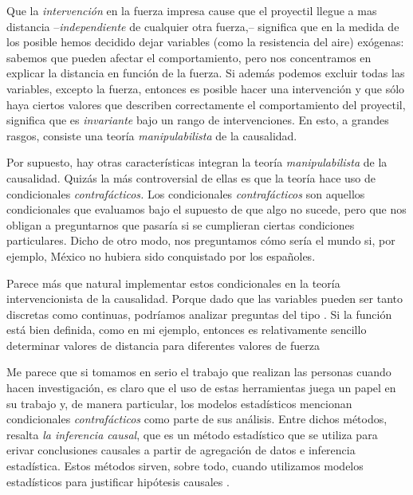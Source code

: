 Que la \emph{intervención} en la fuerza impresa cause que el
proyectil llegue a mas distancia --\emph{independiente} de cualquier
otra fuerza,-- significa que en la medida de los posible hemos
decidido dejar variables (como la resistencia del aire) exógenas:
sabemos que pueden afectar el comportamiento, pero nos concentramos
en explicar la distancia en función de la fuerza. Si además podemos
excluir todas las variables, excepto la fuerza, entonces es posible
hacer una intervención  y que sólo haya ciertos
valores que describen correctamente el comportamiento del proyectil,
significa que es \emph{invariante} bajo un rango de intervenciones.
En esto, a grandes rasgos, consiste una teoría \emph{manipulabilista}
de la causalidad.

Por supuesto, hay otras características integran la teoría \emph
{manipulabilista} de la causalidad. Quizás la más controversial de
ellas es que la teoría hace uso de condicionales
\emph{contrafácticos.} Los condicionales \emph{contrafácticos} son
aquellos condicionales que evaluamos bajo el supuesto de que algo no
sucede, pero que nos obligan a preguntarnos que pasaría si se
cumplieran ciertas condiciones particulares.
Dicho de otro modo, nos preguntamos cómo sería el mundo si, por
ejemplo, México no hubiera sido conquistado por los españoles.

Parece más que natural implementar estos condicionales en la teoría
intervencionista de la causalidad. Porque dado que las variables
pueden ser tanto discretas como continuas, podríamos analizar
preguntas del tipo . Si la función está bien definida,
como en mi ejemplo, entonces es relativamente sencillo determinar
valores de distancia para diferentes valores de fuerza

Me parece que si tomamos en serio el trabajo que realizan las
personas cuando hacen investigación, es claro que el uso de estas
herramientas juega un papel en su trabajo y, de manera particular,
los modelos estadísticos mencionan condicionales
\emph{contrafácticos} como parte de sus análisis. Entre dichos
métodos, resalta \emph{la inferencia causal}, que es un método
estadístico que se utiliza para erivar conclusiones causales a
partir de agregación de datos e inferencia estadística. Estos
métodos sirven, sobre todo, cuando utilizamos modelos estadísticos
para justificar hipótesis causales \parencite{Pearl2016, Pearl2018}.

